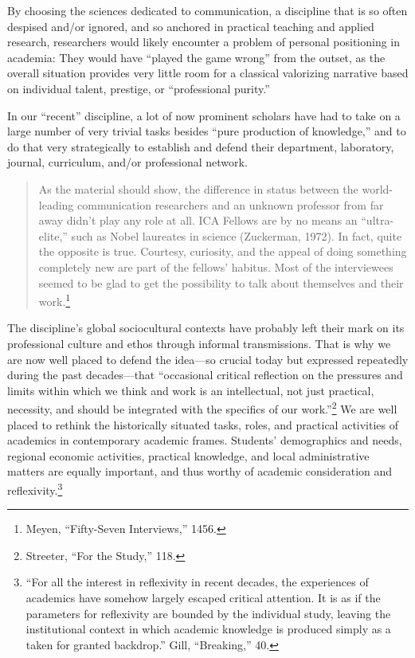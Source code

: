 \documentclass{tufte-handout}
\begin{document}
By choosing the sciences dedicated to communication, a discipline that
is so often despised and/or ignored, and so anchored in practical
teaching and applied research, researchers would likely encounter a
problem of personal positioning in academia: They would have ``played
the game wrong'' from the outset, as the overall situation provides very
little room for a classical valorizing narrative based on individual
talent, prestige, or ``professional purity.''

In our ``recent'' discipline, a lot of now prominent scholars have had
to take on a large number of very trivial tasks besides ``pure
production of knowledge,'' and to do that very strategically to
establish and defend their department, laboratory, journal, curriculum,
and/or professional network.

\begin{quote}
As the material should show, the difference in status between the
world-leading communication researchers and an unknown professor from
far away didn't play any role at all. ICA Fellows are by no means an
``ultra-elite,'' such as Nobel laureates in science (Zuckerman, 1972).
In fact, quite the opposite is true. Courtesy, curiosity, and the appeal
of doing something completely new are part of the fellows' habitus. Most
of the interviewees seemed to be glad to get the possibility to talk
about themselves and their work.\footnote{Meyen, ``Fifty-Seven
  Interviews,'' 1456.}
\end{quote}

The discipline's global sociocultural contexts have probably left their
mark on its professional culture and ethos through informal
transmissions. That is why we are now well placed to defend the
idea---so crucial today but expressed repeatedly during the past
decades---that ``occasional critical reflection on the pressures and
limits within which we think and work is an intellectual, not just
practical, necessity, and should be integrated with the specifics of our
work.''\footnote{Streeter, ``For the Study,'' 118.} We are well placed
to rethink the historically situated tasks, roles, and practical
activities of academics in contemporary academic frames. Students'
demographics and needs, regional economic activities, practical
knowledge, and local administrative matters are equally important, and
thus worthy of academic consideration and reflexivity.\footnote{``For
  all the interest in reflexivity in recent decades, the experiences of
  academics have somehow largely escaped critical attention. It is as if
  the parameters for reflexivity are bounded by the individual study,
  leaving the institutional context in which academic knowledge is
  produced simply as a taken for granted backdrop.'' Gill, ``Breaking,''
  40.}
\end{document}

